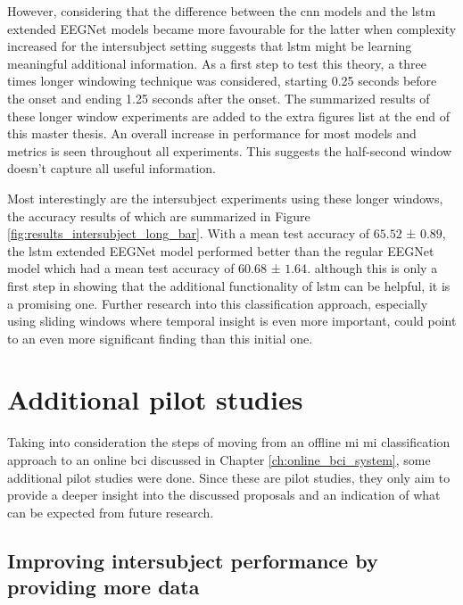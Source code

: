However, considering that the difference between the \gls{cnn} models and the \gls{lstm} extended EEGNet models became more favourable for the latter when complexity increased for the intersubject setting suggests that \gls{lstm} might be learning meaningful additional information.
As a first step to test this theory, a three times longer windowing technique was considered, starting 0.25 seconds before the onset and ending 1.25 seconds after the onset.
The summarized results of these longer window experiments are added to the extra figures list at the end of this master thesis.
An overall increase in performance for most models and metrics is seen throughout all experiments.
This suggests the half-second window doesn't capture all useful information.

Most interestingly are the intersubject experiments using these longer windows, the accuracy results of which are summarized in Figure \ref{fig:results_intersubject_long_bar}.
With a mean test accuracy of $65.52$ ± $0.89$, the \gls{lstm} extended EEGNet model performed better than the regular EEGNet model which had a mean test accuracy of $60.68$ ± $1.64$.
although this is only a first step in showing that the additional functionality of \gls{lstm} can be helpful, it is a promising one.
Further research into this classification approach, especially using sliding windows where temporal insight is even more important, could point to an even more significant finding than this initial one.





\section{Additional pilot studies}
\label{sec:evaluation_pilot_studies}

Taking into consideration the steps of moving from an offline \gls{mi} \gls{mi} classification approach to an online \gls{bci} discussed in Chapter \ref{ch:online_bci_system}, some additional pilot studies were done.
Since these are pilot studies, they only aim to provide a deeper insight into the discussed proposals and an indication of what can be expected from future research.

\subsection{Improving intersubject performance by providing more data}
\label{subsec:evaluation_pilot_studies_more data}

